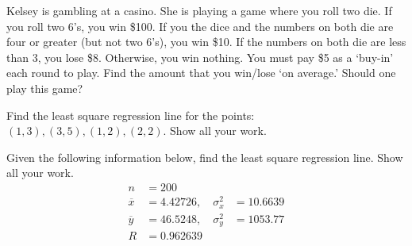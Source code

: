 \documentclass[11pt,letterpaper]{article}
\begin{document}

 Kelsey is gambling at a casino. She is playing a game where you roll two die. If you roll two 6's, you win \$100. If you the dice and the numbers on both die are four or greater (but not two 6's), you win \$10. If the numbers on both die are less than 3, you lose \$8. Otherwise, you win nothing. You must pay \$5 as a `buy-in' each round to play. Find the amount that you win/lose `on average.' Should one play this game?



\newpage



 Find the least square regression line for the points: $(1, 3), (3, 5), (1, 2), (2, 2)$. Show all your work. 



\newpage



 Given the following information below, find the least square regression line. Show all your work. 
	\[
	\begin{aligned}
	n&= 200 \\
	\overline{x}&= 4.42726, \quad \sigma_x^2&= 10.6639 \\
	\overline{y}&= 46.5248, \quad \sigma_y^2&= 1053.77 \\
	R&= 0.962639
	\end{aligned}
	\]



\newpage
\end{document}
